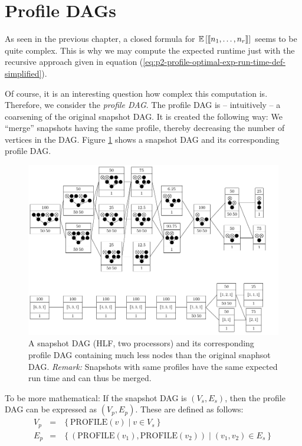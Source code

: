 \section{Profile DAGs}
\label{sec:p2-profile-dags}

As seen in the previous chapter, a closed formula for $\mathbb{E}\left[ \left\llbracket n_1,\dots,n_r \right\rrbracket \right]$ seems to be quite complex. This is why we may compute the expected runtime just with the recursive approach given in equation (\ref{eq:p2-profile-optimal-exp-run-time-def-simplified}).

Of course, it is an interesting question how complex this computation is. Therefore, we consider the \emph{profile DAG}. The profile DAG is -- intuitively -- a coarsening of the original snapshot DAG. It is created the following way: We ``merge'' snapshots having the same profile, thereby decreasing the number of vertices in the DAG. Figure \ref{fig:p2-profile-dag-example-000111223-hlfdet} shows a snapshot DAG and its corresponding profile DAG.

\begin{figure}[t]
  \centering
  \includegraphics{p2/profile_dag_of_000111223_hlfdet.pdf}
  \caption{A snapshot DAG (HLF, two processors) and its corresponding profile DAG containing much less nodes than the original snaphsot DAG. \emph{Remark:} Snapshots with same profiles have the same expected run time and can thus be merged. }
  \label{fig:p2-profile-dag-example-000111223-hlfdet}
\end{figure}

To be more mathematical: If the snapshot DAG is $(V_s, E_s)$, then the profile DAG can be expressed as $(V_p, E_p)$. These are defined as follows:
\begin{eqnarray*}
  V_p &=& \left\{ \text{PROFILE}(v) \mid v \in V_s \right\} \\
  E_p &=& \left\{ \left(\text{PROFILE}(v_1), \text{PROFILE}(v_2) \right) \mid (v_1, v_2)\in E_s\right\}
\end{eqnarray*}

